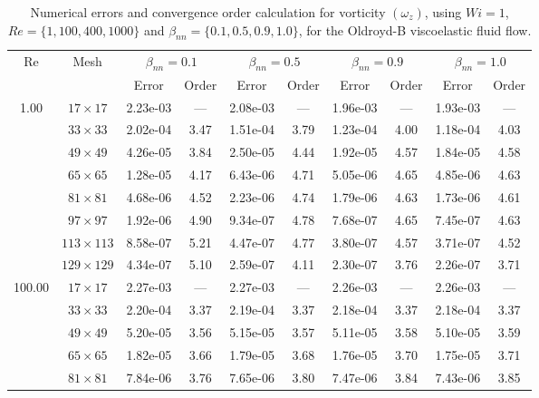 \documentclass[preprint, 12pt]{elsarticle}
\begin{document}
\begin{center}
\begin{table}[H]
\caption{Numerical errors and convergence order calculation for vorticity $(\omega_{z})$, using \mbox{$Wi=1$}, $Re=\{1,100,400,1000\}$ and $\beta_{nn}=\{0.1,0.5,0.9,1.0\}$, for the Oldroyd-B viscoelastic fluid flow.\label{tab_OldroydBWzResumida}}
\scriptsize{
    \begin{tabular*}{\textwidth}{@{\extracolsep\fill}cccccccccc@{}}
    \hline
    \multirow{2}{*}{$\operatorname{Re}$} & \multirow{2}{*}{Mesh} & \multicolumn{2}{c}{$\beta_{nn}=0.1$}  & \multicolumn{2}{c}{$\beta_{nn}=0.5$}  & \multicolumn{2}{c}{$\beta_{nn}=0.9$}  & \multicolumn{2}{c}{$\beta_{nn}=1.0$}\\ %
     & & Error & Order & Error & Order & Error & Order & Error & Order \\
    \hline
    \multirow{7}{*}{1.00} & $17\times 17$ & 2.23e-03 & --- & 2.08e-03 & --- & 1.96e-03 & --- & 1.93e-03 & --- \\
    & $33\times 33$ & 2.02e-04 & 3.47 & 1.51e-04 & 3.79 & 1.23e-04 & 4.00 & 1.18e-04 & 4.03 \\
    & $49\times 49$ & 4.26e-05 & 3.84 & 2.50e-05 & 4.44 & 1.92e-05 & 4.57 & 1.84e-05 & 4.58 \\
    & $65\times 65$ & 1.28e-05 & 4.17 & 6.43e-06 & 4.71 & 5.05e-06 & 4.65 & 4.85e-06 & 4.63 \\
    & $81\times 81$ & 4.68e-06 & 4.52 & 2.23e-06 & 4.74 & 1.79e-06 & 4.63 & 1.73e-06 & 4.61 \\
    & $97\times 97$ & 1.92e-06 & 4.90 & 9.34e-07 & 4.78 & 7.68e-07 & 4.65 & 7.45e-07 & 4.63 \\
    & $113\times 113$ & 8.58e-07 & 5.21 & 4.47e-07 & 4.77 & 3.80e-07 & 4.57 & 3.71e-07 & 4.52 \\
    & $129\times 129$ & 4.34e-07 & 5.10 & 2.59e-07 & 4.11 & 2.30e-07 & 3.76 & 2.26e-07 & 3.71 \\
    \hline\hline
    \multirow{7}{*}{100.00} & $17\times 17$ & 2.27e-03 & --- & 2.27e-03 & --- & 2.26e-03 & --- & 2.26e-03 & --- \\
    & $33\times 33$ & 2.20e-04 & 3.37 & 2.19e-04 & 3.37 & 2.18e-04 & 3.37 & 2.18e-04 & 3.37 \\
    & $49\times 49$ & 5.20e-05 & 3.56 & 5.15e-05 & 3.57 & 5.11e-05 & 3.58 & 5.10e-05 & 3.59 \\
    & $65\times 65$ & 1.82e-05 & 3.66 & 1.79e-05 & 3.68 & 1.76e-05 & 3.70 & 1.75e-05 & 3.71 \\
    & $81\times 81$ & 7.84e-06 & 3.76 & 7.65e-06 & 3.80 & 7.47e-06 & 3.84 & 7.43e-06 & 3.85 \\

\end{tabular*}}
\end{table}
\end{center}
\end{document}
